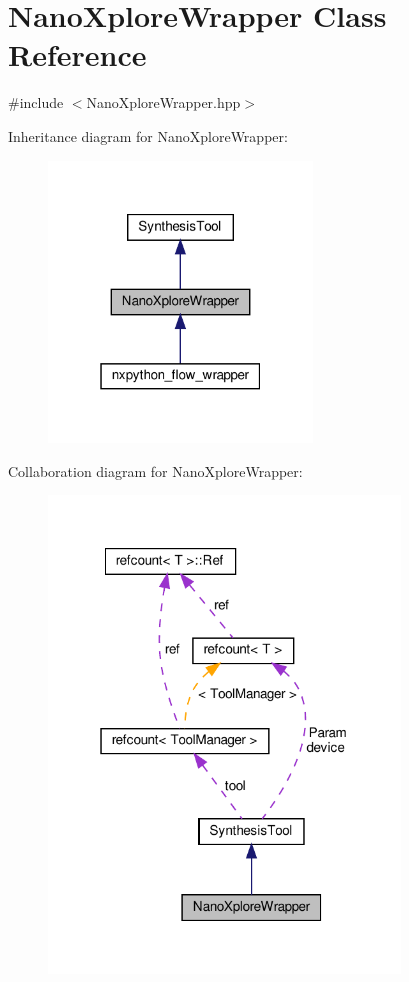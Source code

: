 \hypertarget{classNanoXploreWrapper}{}\section{Nano\+Xplore\+Wrapper Class Reference}
\label{classNanoXploreWrapper}


{\ttfamily \#include $<$Nano\+Xplore\+Wrapper.\+hpp$>$}



Inheritance diagram for Nano\+Xplore\+Wrapper\+:
\nopagebreak
\begin{figure}[H]
\begin{center}
\leavevmode
\includegraphics[width=199pt]{dd/d27/classNanoXploreWrapper__inherit__graph}
\end{center}
\end{figure}


Collaboration diagram for Nano\+Xplore\+Wrapper\+:
\nopagebreak
\begin{figure}[H]
\begin{center}
\leavevmode
\includegraphics[width=265pt]{da/d0d/classNanoXploreWrapper__coll__graph}
\end{center}
\end{figure}
